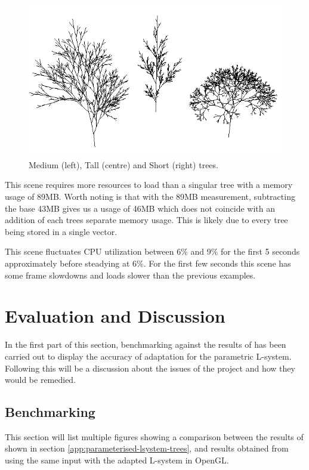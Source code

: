 \documentclass[final]{cmpreport}
\begin{document}
\begin{figure}[ht]
    \includegraphics[scale=0.7]{trees-ghi.PNG} 
    \centering
    \captionsetup{justification=centering}
    \caption{Medium (left), Tall (centre) and Short (right) trees.}
    \label{fig:trees-ghi}
\end{figure}

This scene requires more resources to load than a singular tree with a memory usage of 89MB. 
Worth noting is that with the 89MB measurement, subtracting the base 43MB gives us a usage of 
46MB which does not coincide with an addition of each trees separate memory usage.
This is likely due to every tree being stored in a single vector.

This scene fluctuates CPU utilization between 6\% and 9\% for the first 5 seconds 
approximately before steadying at 6\%. For the first few seconds this scene has some frame 
slowdowns and loads slower than the previous examples.

\section{Evaluation and Discussion}
In the first part of this section, benchmarking against the results of \cite{prusinkiewicz1996systems} 
has been carried out to display the accuracy of adaptation for the parametric L-system. Following 
this will be a discussion about the issues of the project and how they would be remedied. 

\subsection{Benchmarking}
This section will list multiple figures showing a comparison between the results of \cite{prusinkiewicz1996systems} 
shown in section \ref{app:parameterised-lsystem-trees}, and results obtained from using the 
same input with the adapted L-system in OpenGL.
\end{document}
